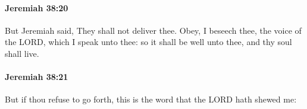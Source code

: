 		\paragraph{Jeremiah 38:20} %
			\label{JEREMIAH-38-20}

			But Jeremiah said, They shall not deliver thee. Obey, I beseech thee, the voice of the LORD, which I speak unto thee: so it shall be well unto thee, and thy soul shall live.


		\paragraph{Jeremiah 38:21} %
			\label{JEREMIAH-38-21}

			But if thou refuse to go forth, this is the word that the LORD hath shewed me:


